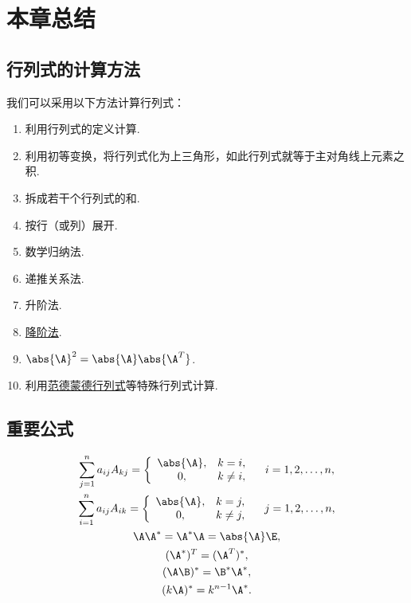 \section{本章总结}
\subsection*{行列式的计算方法}
我们可以采用以下方法计算行列式：
\begin{enumerate}
	\item 利用行列式的定义计算.
	\item 利用初等变换，将行列式化为上三角形，如此行列式就等于主对角线上元素之积.
	\item 拆成若干个行列式的和.
	\item 按行（或列）展开.
	\item 数学归纳法.
	\item 递推关系法.
	\item 升阶法.
	\item \hyperref[theorem:逆矩阵.行列式降阶定理]{降阶法}.
	\item \(\abs{\A}^2 = \abs{\A} \abs{\A^T}\).
	\item 利用\hyperref[equation:行列式.范德蒙德行列式]{范德蒙德行列式}等特殊行列式计算.
\end{enumerate}

\subsection*{重要公式}
\begin{gather}
	\sum_{j=1}^n a_{ij} A_{kj}
	= \left\{ \begin{array}{cl}
		\abs{\A}, & k = i, \\
		0, & k \neq i,
	\end{array} \right.
	\quad i=1,2,\dotsc,n, \\
	\sum_{i=1}^n a_{ij} A_{ik}
	= \left\{ \begin{array}{cl}
		\abs{\A}, & k = j, \\
		0, & k \neq j,
	\end{array} \right.
	\quad j=1,2,\dotsc,n, \\
	\A \A^* = \A^* \A = \abs{\A} \E, \\ %
	(\A^*)^T = (\A^T)^*, \\ %
	(\A \B)^* = \B^* \A^*, \\ %
	(k \A)^* = k^{n-1} \A^*. \\ %
\end{gather}

